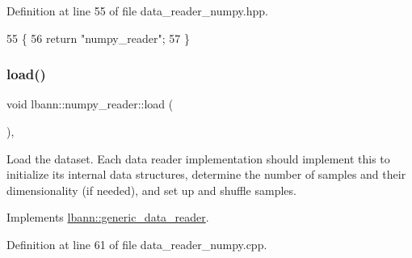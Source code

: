 Definition at line 55 of file data\+\_\+reader\+\_\+numpy.\+hpp.


\begin{DoxyCode}
55                                       \{
56     \textcolor{keywordflow}{return} \textcolor{stringliteral}{"numpy\_reader"};
57   \}
\end{DoxyCode}
\mbox{\label{classlbann_1_1numpy__reader_aafc34d19b30845d54175911d143349de}} 
\subsubsection{\texorpdfstring{load()}{load()}}
{\footnotesize\ttfamily void lbann\+::numpy\+\_\+reader\+::load (\begin{DoxyParamCaption}{ }\end{DoxyParamCaption})\hspace{0.3cm}{\ttfamily [override]}, {\ttfamily [virtual]}}

Load the dataset. Each data reader implementation should implement this to initialize its internal data structures, determine the number of samples and their dimensionality (if needed), and set up and shuffle samples. 

Implements \hyperlink{classlbann_1_1generic__data__reader_afeb47703d988a230a59859cbfc178215}{lbann\+::generic\+\_\+data\+\_\+reader}.



Definition at line 61 of file data\+\_\+reader\+\_\+numpy.\+cpp.


